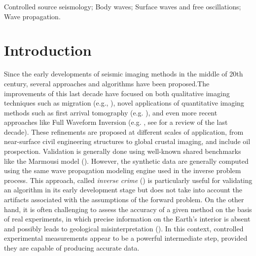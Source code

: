 \documentclass[extra,mreferee]{gji}
\begin{document}
\begin{keywords}
Controlled source seismology; Body waves; Surface waves and free oscillations; Wave propagation.
\end{keywords}

\section{Introduction}


Since the early developments of seismic imaging methods in the middle of 20th century, several approaches and algorithms have been proposed.The improvements of this last decade have focused on both qualitative imaging techniques such as migration (e.g., \cite{berkhout2012mss,guofeng2013gpu}), novel applications of quantitative imaging methods such as first arrival tomography (e.g. \cite{bohm2015cws}), and even more recent approaches like Full Waveform Inversion (e.g. \cite{perez2014awi}, see \cite{virieux2009fwi} for a review of the last decade). These refinements are proposed at different scales of application, from near-surface civil engineering structures to global crustal imaging, and include oil prospection. Validation is generally done using well-known shared benchmarks like the Marmousi model (\cite{martin2006marmousi2}). However, the synthetic data are generally computed using the same wave propagation modeling engine used in the inverse problem process. This approach, called \textit{inverse crime} (\cite{wirgin2004tic}) is particularly useful for validating an algorithm in its early development stage but does not take into account the artifacts associated with the assumptions of the forward problem. On the other hand, it is often challenging to assess the accuracy of a given method on the basis of real experiments, in which precise information on the Earth's interior is absent and possibly leads to geological misinterpretation (\cite{morozov2004arf}). In this context, controlled experimental measurements appear to be a powerful intermediate step, provided they are capable of producing accurate data.
\end{document}
